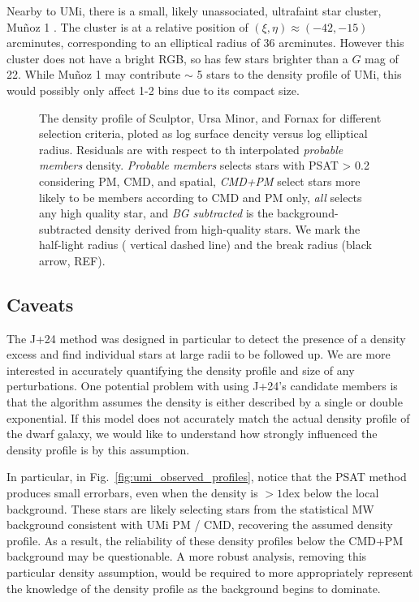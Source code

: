 Nearby to UMi, there is a small, likely unassociated, ultrafaint star
cluster, Muñoz 1 \citep{munoz+2012}. The cluster is at a relative
position of \((\xi, \eta) \approx(-42, -15)\) arcminutes, corresponding
to an elliptical radius of 36 arcminutes. However this cluster does not
have a bright RGB, so has few stars brighter than a \(G\) mag of 22.
While Muñoz 1 may contribute \(\sim\) 5 stars to the density profile of
UMi, this would possibly only affect 1-2 bins due to its compact size.

\begin{figure}
\centering
{}
\caption[Sculptor density profiles]{The density profile of Sculptor,
Ursa Minor, and Fornax for different selection criteria, ploted as log
surface dencity versus log elliptical radius. Residuals are with respect
to th interpolated \emph{probable members} density. \emph{Probable
members} selects stars with PSAT \textgreater{} 0.2 considering PM, CMD,
and spatial, \emph{CMD+PM} select stars more likely to be members
according to CMD and PM only, \emph{all} selects any high quality star,
and \emph{BG subtracted} is the background-subtracted density derived
from high-quality stars. We mark the half-light radius ( vertical dashed
line) and the break radius (black arrow,
REF).}\label{fig:scl_observed_profiles}
\end{figure}

\subsection{Caveats}\label{caveats}

The J+24 method was designed in particular to detect the presence of a
density excess and find individual stars at large radii to be followed
up. We are more interested in accurately quantifying the density profile
and size of any perturbations. One potential problem with using J+24's
candidate members is that the algorithm assumes the density is either
described by a single or double exponential. If this model does not
accurately match the actual density profile of the dwarf galaxy, we
would like to understand how strongly influenced the density profile is
by this assumption.

In particular, in Fig.~\ref{fig:umi_observed_profiles}, notice that the
PSAT method produces small errorbars, even when the density is \(>1\)dex
below the local background. These stars are likely selecting stars from
the statistical MW background consistent with UMi PM / CMD, recovering
the assumed density profile. As a result, the reliability of these
density profiles below the CMD+PM background may be questionable. A more
robust analysis, removing this particular density assumption, would be
required to more appropriately represent the knowledge of the density
profile as the background begins to dominate.

